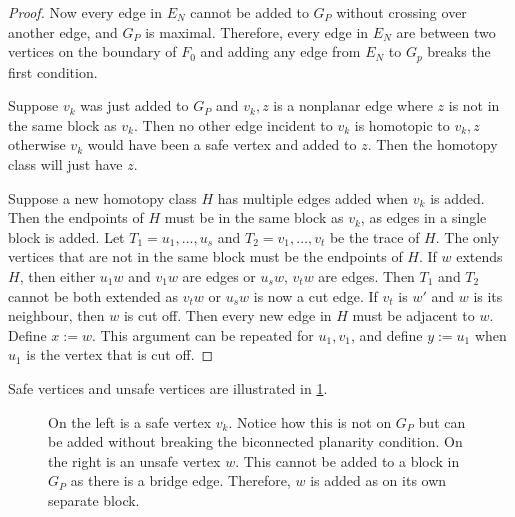 \begin{proof}
	Now every edge in \(E_N\) cannot be added to \(G_P\) without crossing over another edge, and \(G_P\) is maximal. Therefore, every edge in \(E_N\) are between two vertices on the boundary of $F_0$ and adding any edge from $E_N$ to $G_p$ breaks the first condition.

	Suppose $v_k$ was just added to $G_P$ and $v_k, z$ is a nonplanar edge where $z$ is not in the same block as $v_k$. Then no other edge incident to $v_k$ is homotopic to $v_k, z$ otherwise $v_k$ would have been a safe vertex and added to $z$. Then the homotopy class will just have $z$. 

	Suppose a new homotopy class $H$ has multiple edges added when $v_k$ is added. Then the endpoints of $H$ must be in the same block as $v_k$, as edges in a single block is added. Let $T_1 = u_1, \ldots, u_s$ and $T_2 = v_1, \ldots, v_t$ be the trace of $H$. The only vertices that are not in the same block must be the endpoints of $H$. If $w$ extends $H$, then either $u_1 w$ and $v_1 w$ are edges or $u_s w$, $v_t w$ are edges. Then $T_1$ and $T_2$ cannot be both extended as $v_t w$ or $u_s w$ is now a cut edge. If $v_t$ is $w'$ and $w$ is its neighbour, then $w$ is cut off. Then every new edge in $H$ must be adjacent to $w$. Define $x := w$. This argument can be repeated for $u_1, v_1$, and define $y := u_1$ when $u_1$ is the vertex that is cut off. 
\end{proof}


Safe vertices and unsafe vertices are illustrated in \cref{fig:safe_vertices}.

\begin{figure}[h!]
	\centering
	
	\caption[Safe and unsafe vertices]{On the left is a safe vertex $v_k$. Notice how this is not on $G_P$ but can be added without breaking the biconnected planarity condition. On the right is an unsafe vertex $w$. This cannot be added to a block in $G_P$ as there is a bridge edge. Therefore, $w$ is added as on its own separate block.}\label{fig:safe_vertices}
\end{figure}


